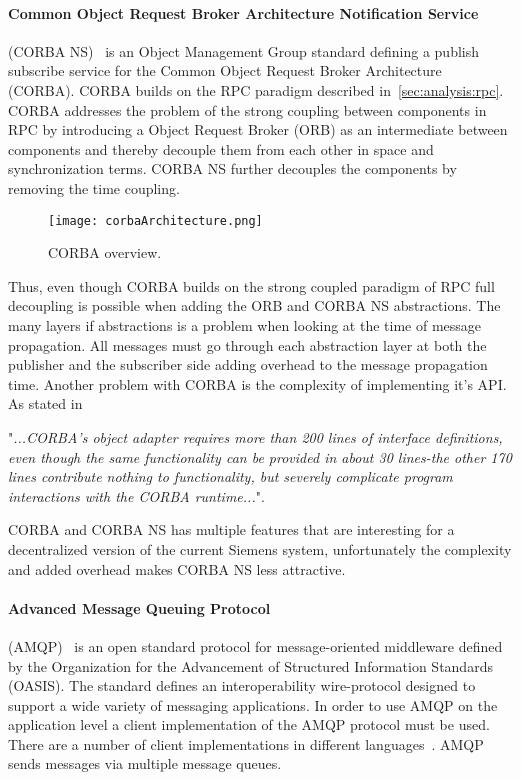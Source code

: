 \paragraph{Common Object Request Broker Architecture Notification Service} (CORBA NS)~\cite{corbanotificationservicespecification} is an Object Management Group standard defining a publish subscribe service for the Common Object Request Broker Architecture (CORBA).
CORBA builds on the RPC paradigm described in~\cref{sec:analysis:rpc}.
CORBA addresses the problem of the strong coupling between components in RPC by introducing a Object Request Broker (ORB) as an intermediate between components and thereby decouple them from each other in space and synchronization terms. CORBA NS further decouples the components by removing the time coupling.

\begin{figure}[!h]
	\centering
	\texttt{[image: corbaArchitecture.png]} 
	\caption[JMS overview]{
		\label{fig:corbaOverview} 
		\footnotesize{%
			CORBA overview.
		}
	}
\end{figure}

Thus, even though CORBA builds on the strong coupled paradigm of RPC full decoupling is possible when adding the ORB and CORBA NS abstractions. The many layers if abstractions is a problem when looking at the time of message propagation.
All messages must go through each abstraction layer at both the publisher and the subscriber side adding overhead to the message propagation time. Another problem with CORBA is the complexity of implementing it's API. As stated in ~\cite{Henning:2006:RFC:1142031.1142044}

"\textit{...CORBA's object adapter requires more than 200 lines of interface definitions, even though the same functionality can be provided in about 30 lines-the other 170 lines contribute nothing to functionality, but severely complicate program interactions with the CORBA runtime...}".

CORBA and CORBA NS has multiple features that are interesting for a decentralized version of the current Siemens system, unfortunately the complexity and added overhead makes CORBA NS less attractive.

\paragraph{Advanced Message Queuing Protocol}(AMQP)~\cite{amqp} is an open standard protocol for message-oriented middleware defined by the Organization for the Advancement of Structured Information Standards (OASIS). 
The standard defines an interoperability wire-protocol designed to support a wide variety of messaging applications. In order to use AMQP on the application level a client implementation of the AMQP protocol must be used. 
There are a number of client implementations in different languages~\cite{amqpimplementations}. AMQP sends messages via multiple message queues.

